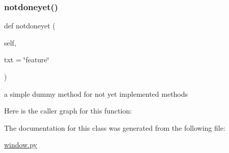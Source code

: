 \subsubsection{\texorpdfstring{notdoneyet()}{notdoneyet()}}
{\footnotesize\ttfamily def notdoneyet (\begin{DoxyParamCaption}\item[{}]{self,  }\item[{}]{txt = {\ttfamily \char`\"{}feature\char`\"{}} }\end{DoxyParamCaption})}



a simple dummy method for not yet implemented methods 

Here is the caller graph for this function\+:


The documentation for this class was generated from the following file\+:\begin{DoxyCompactItemize}
\item 
\mbox{\hyperlink{window_8py}{window.\+py}}\end{DoxyCompactItemize}
